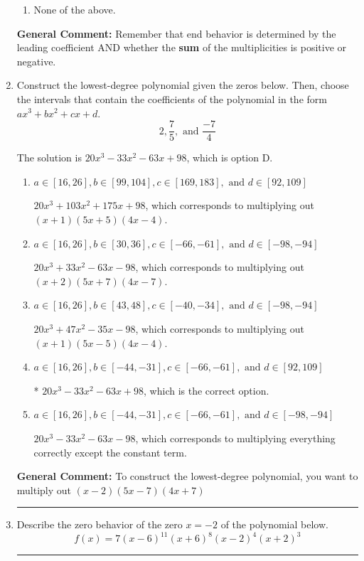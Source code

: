 \documentclass{extbook}[14pt]
\newcommand{\litem}[1]{\item #1

\rule{\textwidth}{0.4pt}}
\begin{document}
\begin{enumerate}
{\begin{enumerate}[label=\Alph*.]
\begin{multicols}{2}
\end{multicols}\item None of the above.\end{enumerate}
\textbf{General Comment:} Remember that end behavior is determined by the leading coefficient AND whether the \textbf{sum} of the multiplicities is positive or negative.
}
\litem{
Construct the lowest-degree polynomial given the zeros below. Then, choose the intervals that contain the coefficients of the polynomial in the form $ax^3+bx^2+cx+d$.
\[ 2, \frac{7}{5}, \text{ and } \frac{-7}{4} \]

The solution is \( 20x^{3} -33 x^{2} -63 x + 98 \), which is option D.\begin{enumerate}[label=\Alph*.]
\item \( a \in [16, 26], b \in [99, 104], c \in [169, 183], \text{ and } d \in [92, 109] \)

$20x^{3} +103 x^{2} +175 x + 98$, which corresponds to multiplying out $(x + 1)(5x + 5)(4x -4)$.
\item \( a \in [16, 26], b \in [30, 36], c \in [-66, -61], \text{ and } d \in [-98, -94] \)

$20x^{3} +33 x^{2} -63 x -98$, which corresponds to multiplying out $(x + 2)(5x + 7)(4x -7)$.
\item \( a \in [16, 26], b \in [43, 48], c \in [-40, -34], \text{ and } d \in [-98, -94] \)

$20x^{3} +47 x^{2} -35 x -98$, which corresponds to multiplying out $(x + 1)(5x -5)(4x -4)$.
\item \( a \in [16, 26], b \in [-44, -31], c \in [-66, -61], \text{ and } d \in [92, 109] \)

* $20x^{3} -33 x^{2} -63 x + 98$, which is the correct option.
\item \( a \in [16, 26], b \in [-44, -31], c \in [-66, -61], \text{ and } d \in [-98, -94] \)

$20x^{3} -33 x^{2} -63 x -98$, which corresponds to multiplying everything correctly except the constant term.
\end{enumerate}

\textbf{General Comment:} To construct the lowest-degree polynomial, you want to multiply out $(x -2)(5x -7)(4x + 7)$
}
\litem{
Describe the zero behavior of the zero $x = -2$ of the polynomial below.
\[ f(x) = 7(x - 6)^{11}(x + 6)^{8}(x - 2)^{4}(x + 2)^{3} \]

}
\end{enumerate}
\end{document}
